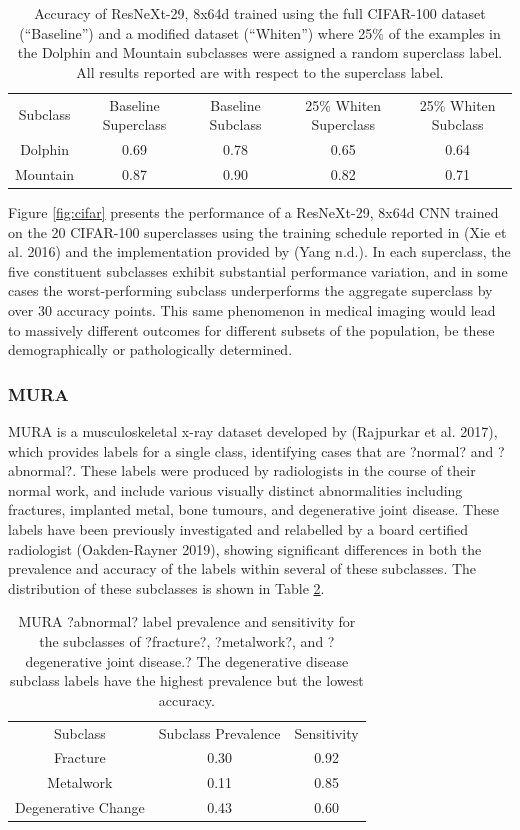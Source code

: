 \documentclass{article}
\begin{document}
\begin{table}[]
\begin{tabular}{ccccc}
 Subclass & Baseline Superclass  & Baseline Subclass  & 25\% Whiten Superclass  & 25\% Whiten Subclass \\
 Dolphin & 0.69 & 0.78  & 0.65  & 0.64  \\
 Mountain & 0.87 & 0.90  & 0.82 & 0.71  \\
\end{tabular}
\label{tab:cifar2}
\caption{Accuracy of ResNeXt-29, 8x64d trained using the full CIFAR-100 dataset (``Baseline'') and a modified dataset (``Whiten'') where 25\% of the examples in the Dolphin and Mountain subclasses were assigned a random superclass label.  All results reported are with respect to the superclass label.
}
\end{table}

Figure \ref{fig:cifar} presents the performance of a ResNeXt-29, 8x64d CNN trained on the 20 CIFAR-100 superclasses using the training schedule reported in (Xie et al. 2016) and the implementation provided by (Yang n.d.).  
In each superclass, the five constituent subclasses exhibit substantial performance variation, and in some cases the worst-performing subclass underperforms the aggregate superclass by over 30 accuracy points.  
This same phenomenon in medical imaging would lead to massively different outcomes for different subsets of the population, be these demographically or pathologically determined.  

\subsubsection{MURA}

MURA is a musculoskeletal x-ray dataset developed by (Rajpurkar et al. 2017), which provides labels for a single class, identifying cases that are ?normal? and ?abnormal?. 
These labels were produced by radiologists in the course of their normal work, and include various visually distinct abnormalities including fractures, implanted metal, bone tumours, and degenerative joint disease. 
These labels have been previously investigated and relabelled by a board certified radiologist (Oakden-Rayner 2019), showing significant differences in both the prevalence and accuracy of the labels within several of these subclasses. 
The distribution of these subclasses is shown in Table \ref{tab:mura1}.


\begin{table}[]
\begin{tabular}{ccc}
 Subclass & Subclass Prevalence & Sensitivity \\
 Fracture & 0.30 & 0.92   \\
 Metalwork & 0.11 & 0.85    \\
 Degenerative Change & 0.43 & 0.60 
\end{tabular}
\label{tab:mura1}
\caption{MURA ?abnormal? label prevalence and sensitivity for the subclasses of ?fracture?, ?metalwork?, and ?degenerative joint disease.? The degenerative disease subclass labels have the highest prevalence but the lowest accuracy.}
\end{table}
\end{document}
